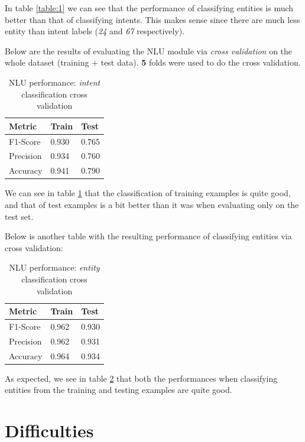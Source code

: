 \documentclass[11pt,a4paper]{article}
\newcommand{\mnintentlabels}{67}
\newcommand{\mnentitylabels}{24}
\begin{document}
	In table \ref{table:1} we can see that the performance of classifying entities is much better than that of classifying intents. This makes sense since there are much less entity than intent labels (\textit{\mnentitylabels} and \textit{\mnintentlabels} respectively).
	
	Below are the results of evaluating the NLU module via \textit{cross validation} on the whole dataset (training + test data). \textbf{5} folds were used to do the cross validation.
	
	\begin{table}[h!]
		\centering
		\begin{tabular}{l|l|l}
			\textbf{Metric} & \textbf{Train} & \textbf{Test} \\ 
			\hline 
			F1-Score & 0.930 & 0.765 \\ 
			\hline 
			Precision & 0.934 & 0.760\\ 
			\hline 
			Accuracy & 0.941 & 0.790 \\ 
			\hline 
		\end{tabular} 
		\caption{NLU performance: \textit{intent} classification cross validation}
		\label{table:2}
	\end{table}	
	
	We can see in table \ref{table:2} that the classification of training examples is quite good, and that of test examples is a bit better than it was when evaluating only on the test set. 
	
	Below is another table with the resulting performance of classifying entities via cross validation:
	
	\begin{table}[h!]
		\centering
		\begin{tabular}{l|l|l}
			\textbf{Metric} & \textbf{Train} & \textbf{Test} \\ 
			\hline 
			F1-Score & 0.962 & 0.930 \\ 
			\hline 
			Precision & 0.962 & 0.931 \\ 
			\hline 
			Accuracy & 0.964 & 0.934 \\ 
			\hline 
		\end{tabular} 
		\caption{NLU performance: \textit{entity} classification cross validation}
		\label{table:3}
	\end{table}	

	As expected, we see in table \ref{table:3} that both the performances when classifying entities from the training and testing examples are quite good. 
	

\section{Difficulties}
\label{sec-difficulties}
\end{document}

